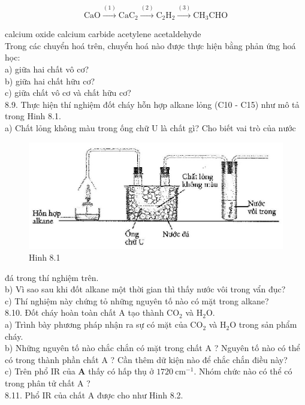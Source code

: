 \documentclass[10pt]{article}
\begin{document}
$$
\mathrm{CaO} \xrightarrow{(1)} \mathrm{CaC}_{2} \xrightarrow{(2)} \mathrm{C}_{2} \mathrm{H}_{2} \xrightarrow{(3)} \mathrm{CH}_{3} \mathrm{CHO}
$$

calcium oxide calcium carbide acetylene acetaldehyde\\
Trong các chuyển hoá trên, chuyển hoá nào được thực hiện bằng phản ứng hoá học:\\
a) giữa hai chất vô cơ?\\
b) giữa hai chất hữu cơ?\\
c) giữa chất vô cơ và chất hữu cơ?\\
8.9. Thực hiện thí nghiệm đốt cháy hỗn hợp alkane lỏng (C10 - C15) như mô tả trong Hinh 8.1.\\
a) Chất lỏng không màu trong ống chữ U là chất gì? Cho biết vai trò của nước

\begin{figure}[h]
\begin{center}
  \includegraphics[width=\textwidth]{2025_10_23_f2823ef970776205e47bg-25}
\captionsetup{labelformat=empty}
\caption{Hinh 8.1}
\end{center}
\end{figure}

đá trong thí nghiệm trên.\\
b) Vì sao sau khi đốt alkane một thời gian thì thấy nước vôi trong vẩn đục?\\
c) Thí nghiệm này chứng tỏ những nguyên tố nào có mặt trong alkane?\\
8.10. Đốt cháy hoàn toàn chất A tạo thành $\mathrm{CO}_{2}$ và $\mathrm{H}_{2} \mathrm{O}$.\\
a) Trình bày phương pháp nhận ra sự có mặt của $\mathrm{CO}_{2}$ và $\mathrm{H}_{2} \mathrm{O}$ trong sản phẩm cháy.\\
b) Những nguyên tố nào chắc chắn có mặt trong chất A ? Nguyên tố nào có thể có trong thành phần chất A ? Cần thêm dữ kiện nào để chắc chắn điều này?\\
c) Trên phổ IR của $\mathbf{A}$ thấy có hấp thụ ở $1720 \mathrm{~cm}^{-1}$. Nhóm chức nào có thể có trong phân tử chất A ?\\
8.11. Phổ IR của chất A được cho như Hinh 8.2.
\end{document}
